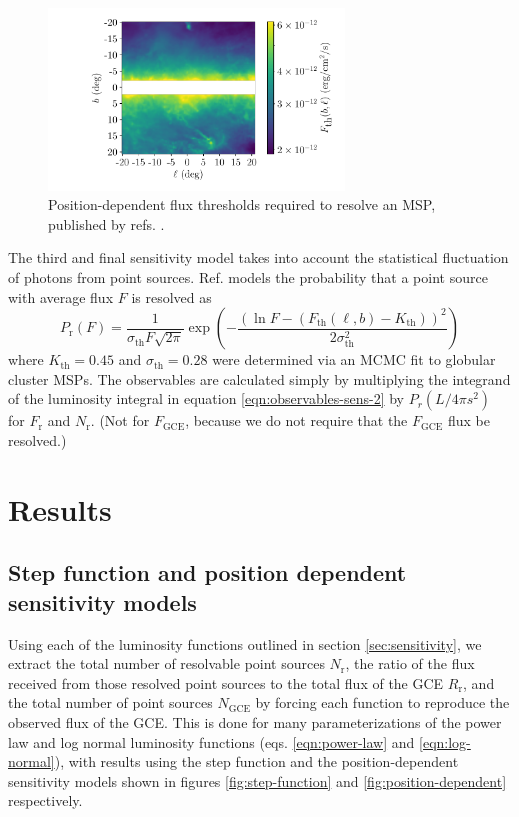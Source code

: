 \documentclass[a4paper,11pt]{article}
\newcommand{\parens}[1]{\left(#1\right)}
\newcommand{\expp}[1]{\exp \parens{#1}}
\newcommand{\comment}[1]{\emph{\color{red}{#1}}}
\begin{document}
\begin{figure}
    \centering
    \includegraphics[width=0.7\textwidth]{figs/sensitivity-map.pdf}
    \caption{Position-dependent flux thresholds required to resolve an MSP, published by refs. \cite{Fermi-LAT:2019yla, Ballet:2020hze}. \comment{Maybe I shouldn't show this plot. It's barely original; just a display of a FITS file pulled from the 4FGL website. But I could overlay the previous figure of where the 47 point sources are. Would that be useful?}}
    \label{fig:sensitivity}
\end{figure}

The third and final sensitivity model takes into account the statistical fluctuation of photons from point sources. Ref. \cite{Ploeg:2020jeh} models the probability that a point source with average flux $F$ is resolved as
\begin{equation}
    P_\text{r}(F) = \frac{1}{\sigma_\text{th} F\sqrt{2\pi}} \expp{-\frac{(\ln F - (F_\text{th}(\ell, b) - K_\text{th}))^2}{2\sigma_\text{th}^2}}
    \label{eqn:ploeg-smoothing}
\end{equation}
where $K_\text{th} = 0.45$ and $\sigma_\text{th} = 0.28$ were determined via an MCMC fit to globular cluster MSPs. The observables are calculated simply by multiplying the integrand of the luminosity integral in equation \ref{eqn:observables-sens-2} by $P_r(L/4\pi s^2)$ for $F_\text{r}$ and $N_\text{r}$. (Not for $F_\text{GCE}$, because we do not require that the $F_\text{GCE}$ flux be resolved.)






\section{Results}
\subsection{Step function and position dependent sensitivity models}
Using each of the luminosity functions outlined in section \ref{sec:sensitivity}, we extract the total number of resolvable point sources $N_\text{r}$, the ratio of the flux received from those resolved point sources to the total flux of the GCE $R_\text{r}$, and the total number of point sources $N_\text{GCE}$ by forcing each function to reproduce the observed flux of the GCE. This is done for many parameterizations of the power law and log normal luminosity functions (eqs. \ref{eqn:power-law} and \ref{eqn:log-normal}), with results using the step function and the position-dependent sensitivity models shown in figures \ref{fig:step-function} and \ref{fig:position-dependent} respectively.
\end{document}

